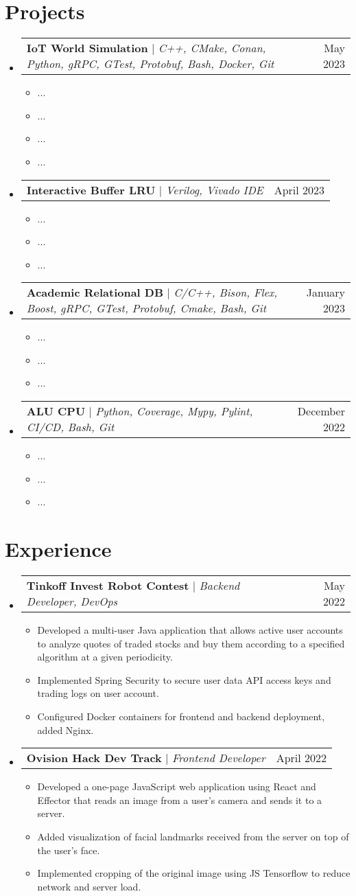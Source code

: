 \documentclass[letterpaper,11pt]{article}
\makeatletter
\newcommand{\resumeItem}[1]{
  \item\small{
    {#1 \vspace{-2pt}}
  }
}
\newcommand{\resumeProjectHeading}[2]{
    \item
    \begin{tabular*}{0.97\textwidth}{l@{\extracolsep{\fill}}r}
      \small#1 & #2 \\
    \end{tabular*}\vspace{-7pt}
}
\newcommand{\resumeExperienceHeading}[2]{
    \item
    \begin{tabular*}{0.97\textwidth}{l@{\extracolsep{\fill}}r}
      \small#1 & #2 \\
    \end{tabular*}\vspace{-7pt}
}
\newcommand{\resumeSubHeadingListStart}{\begin{itemize}[leftmargin=0.15in, label={}]}
\newcommand{\resumeSubHeadingListEnd}{\end{itemize}}
\newcommand{\resumeItemListStart}{\begin{itemize}}
\newcommand{\resumeItemListEnd}{\end{itemize}\vspace{-5pt}}
\makeatother
\begin{document}
\section{Projects}
    \resumeSubHeadingListStart
    
        \resumeProjectHeading
        {\textbf{IoT World Simulation} $|$ \footnotesize\emph{C++, CMake, Conan, Python, gRPC, GTest, Protobuf, Bash, Docker, Git}}{May 2023}
        \resumeItemListStart
            \resumeItem{...}
            \resumeItem{...}
            \resumeItem{...}
            \resumeItem{...}
        \resumeItemListEnd

        \resumeProjectHeading
        {\textbf{Interactive Buffer LRU} $|$ \footnotesize\emph{Verilog, Vivado IDE}}{April 2023}
        \resumeItemListStart
            \resumeItem{...}
            \resumeItem{...}
            \resumeItem{...}
        \resumeItemListEnd
          
        \resumeProjectHeading
        {\textbf{Academic Relational DB} $|$ \footnotesize\emph{C/C++, Bison, Flex, Boost, gRPC, GTest, Protobuf, Cmake, Bash, Git}}{January 2023}
        \resumeItemListStart
            \resumeItem{...}
            \resumeItem{...}
            \resumeItem{...}
        \resumeItemListEnd

        \resumeProjectHeading
        {\textbf{ALU CPU} $|$ \footnotesize\emph{Python, Coverage, Mypy, Pylint, CI/CD, Bash, Git}}{December 2022}
        \resumeItemListStart
            \resumeItem{...}
            \resumeItem{...}
            \resumeItem{...}
        \resumeItemListEnd
          
    \resumeSubHeadingListEnd

\section{Experience}
  \resumeSubHeadingListStart

        \resumeExperienceHeading
          {\textbf{Tinkoff Invest Robot Contest} $|$ \footnotesize\emph{Backend Developer, DevOps}}{May 2022}
        \resumeItemListStart
            \resumeItem{Developed a multi-user Java application that allows active user accounts to analyze quotes of traded stocks and buy them according to a specified algorithm at a given periodicity.}
            \resumeItem{Implemented Spring Security to secure user data API access keys and trading logs on user account.}
            \resumeItem{Configured Docker containers for frontend and backend deployment, added Nginx.}
        \resumeItemListEnd

        \resumeExperienceHeading
          {\textbf{Ovision Hack Dev Track} $|$ \footnotesize\emph{Frontend Developer }}{April 2022}
        \resumeItemListStart
            \resumeItem{Developed a one-page JavaScript web application using React and Effector that reads an image from a user's camera and sends it to a server.}
            \resumeItem{Added visualization of facial landmarks received from the server on top of the user's face.}
            \resumeItem{Implemented cropping of the original image using JS Tensorflow to reduce network and server load.}
        \resumeItemListEnd

    \resumeSubHeadingListEnd 
\end{document}
